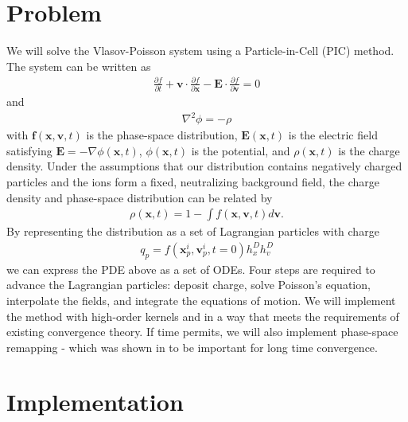 \documentclass[aps,12pt, notitlepage]{revtex4-1}
\def\b{\mathbf}\def\e{\epsilon}
\def\f{\b{f}}
\renewcommand{\=}[1]{\overline{#1}}
\newcommand{\pder}[2]{\frac{\partial{#1}}{\partial{#2}}}
\begin{document}

\section{Problem}
We will solve the Vlasov-Poisson system using a Particle-in-Cell (PIC) method. 
The system can be written as
\begin{align*}
\pder{f}{t} + \pmb{v} \cdot \pder{f}{\pmb{x}} - \pmb{E} \cdot \pder{f}{\pmb{v}} = 0
\end{align*}
and 
\begin{align*}
\nabla^2 \phi = -\rho
\end{align*}
with $\f(\pmb{x}, \pmb{v}, t)$ is the phase-space distribution, $\pmb{E}(\pmb{x}, t)$ is the electric field satisfying $\pmb{E} = -\nabla \phi(\pmb{x}, t)$, $\phi(\pmb{x}, t)$ is the potential, and $\rho(\pmb{x}, t)$ is the charge density. 
Under the assumptions that our distribution contains negatively charged particles and the ions form a fixed, neutralizing background field, the charge density and phase-space distribution can be related by 
\begin{align*}
\rho(\pmb{x}, t) = 1 - \int f(\pmb{x}, \pmb{v}, t) d\pmb{v}. 
\end{align*}
By representing the distribution as a set of Lagrangian particles with charge 
\begin{align*}
q_p = f(\pmb{x}_p^i, \pmb{v}_p^i, t = 0) h_x^D h_v^D
\end{align*}
we can express the PDE above as a set of ODEs. 
Four steps are required to advance the Lagrangian particles: deposit charge, solve Poisson's equation, interpolate the fields, and integrate the equations of motion.  
We will implement the method with high-order kernels and in a way that meets the requirements of existing convergence theory. 
If time permits, we will also implement phase-space remapping - which was shown in \cite{wang2011particle} to be important for long time convergence. 

\section{Implementation}
\end{document}
